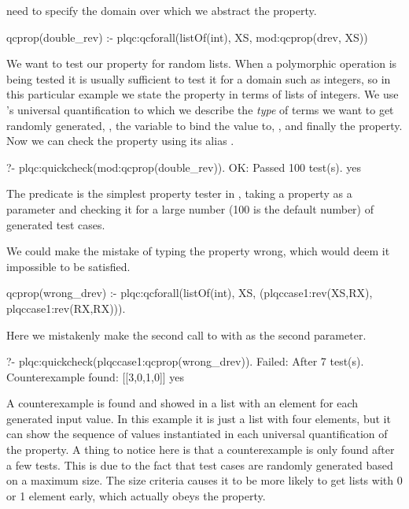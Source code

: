 need to specify the domain over which we abstract the property.
%
\begin{yapcode}
 qcprop(double_rev) :-
   plqc:qcforall(listOf(int), XS,
                 mod:qcprop({drev, XS}))
\end{yapcode}
%
We want to test our  property for random  lists.
%
When a polymorphic operation is being tested it is usually sufficient
to test it for a domain such as integers, so in this particular example
we state the property in terms of lists of integers.
%
We use \plqc{}'s universal quantification to which we describe the
\emph{type} of terms we want to get randomly generated,
, the variable to bind the value to, ,
and finally the property.
%
Now we can check the property using its alias .
\begin{yapcode}
   ?- plqc:quickcheck(mod:qcprop(double_rev)).
 OK: Passed 100 test(s).
 yes
\end{yapcode}
%
The  predicate is the simplest property tester in
\plqc{}, taking a property as a parameter and checking it for a large
number (100 is the default number) of generated test cases.


We could make the mistake of typing the property wrong, which would deem
it impossible to be satisfied.
%
\begin{yapcode}
 qcprop(wrong_drev) :-
   plqc:qcforall(listOf(int), XS,
                 (plqccase1:rev(XS,RX),
                  plqccase1:rev(RX,RX))).
\end{yapcode}
%
Here we mistakenly make the second call to  with  as
the second parameter.
%
\begin{yapcode}
   ?- plqc:quickcheck(plqccase1:qcprop(wrong_drev)).
 Failed: After 7 test(s).
 Counterexample found: [[3,0,1,0]] 
 yes
\end{yapcode}
A counterexample is found and showed in a list with an element for each
generated input value.
%
In this example it is just a list with four elements, but it can show
the sequence of values instantiated in each universal quantification of
the property.
%
A thing to notice here is that a counterexample is only found after a
few tests.
%
This is due to the fact that test cases are randomly generated based on
a maximum size.
%
The size criteria causes it to be more likely to get lists with 0 or 1
element early, which actually obeys the property.



